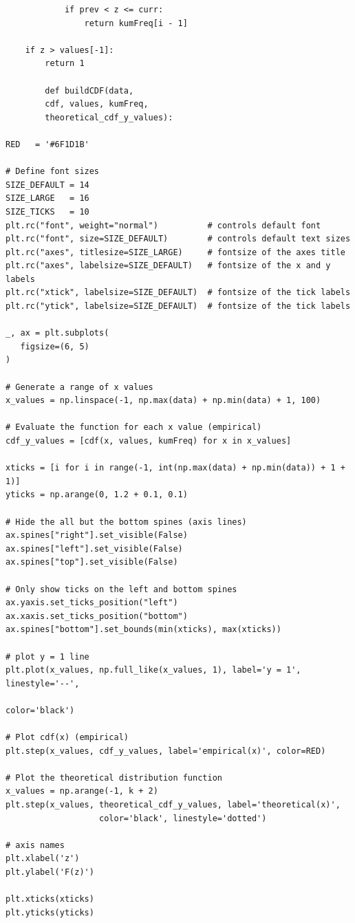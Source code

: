 \documentclass[a4paper, 14pt]{extarticle}
\begin{document}
\begin{lstlisting}
            if prev < z <= curr:
                return kumFreq[i - 1]

    if z > values[-1]:
        return 1

        def buildCDF(data, 
        cdf, values, kumFreq, 
        theoretical_cdf_y_values):

RED   = '#6F1D1B'

# Define font sizes
SIZE_DEFAULT = 14
SIZE_LARGE   = 16
SIZE_TICKS   = 10
plt.rc("font", weight="normal")          # controls default font
plt.rc("font", size=SIZE_DEFAULT)        # controls default text sizes
plt.rc("axes", titlesize=SIZE_LARGE)     # fontsize of the axes title
plt.rc("axes", labelsize=SIZE_DEFAULT)   # fontsize of the x and y labels
plt.rc("xtick", labelsize=SIZE_DEFAULT)  # fontsize of the tick labels
plt.rc("ytick", labelsize=SIZE_DEFAULT)  # fontsize of the tick labels

_, ax = plt.subplots(
   figsize=(6, 5)
)

# Generate a range of x values
x_values = np.linspace(-1, np.max(data) + np.min(data) + 1, 100)

# Evaluate the function for each x value (empirical)
cdf_y_values = [cdf(x, values, kumFreq) for x in x_values]

xticks = [i for i in range(-1, int(np.max(data) + np.min(data)) + 1 + 1)]
yticks = np.arange(0, 1.2 + 0.1, 0.1)

# Hide the all but the bottom spines (axis lines)
ax.spines["right"].set_visible(False)
ax.spines["left"].set_visible(False)
ax.spines["top"].set_visible(False)

# Only show ticks on the left and bottom spines
ax.yaxis.set_ticks_position("left")
ax.xaxis.set_ticks_position("bottom")
ax.spines["bottom"].set_bounds(min(xticks), max(xticks))

# plot y = 1 line
plt.plot(x_values, np.full_like(x_values, 1), label='y = 1', linestyle='--', 
                                                             color='black')

# Plot cdf(x) (empirical)
plt.step(x_values, cdf_y_values, label='empirical(x)', color=RED)

# Plot the theoretical distribution function
x_values = np.arange(-1, k + 2)
plt.step(x_values, theoretical_cdf_y_values, label='theoretical(x)', 
                   color='black', linestyle='dotted')

# axis names
plt.xlabel('z')
plt.ylabel('F(z)')

plt.xticks(xticks)
plt.yticks(yticks)


\end{lstlisting}
\end{document}
